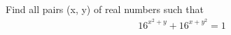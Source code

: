 \item Find all pairs (x, y) of real numbers such that
\begin{align}
16^{x^2 + y} + 16^{x + y^2} = 1
\end{align}

